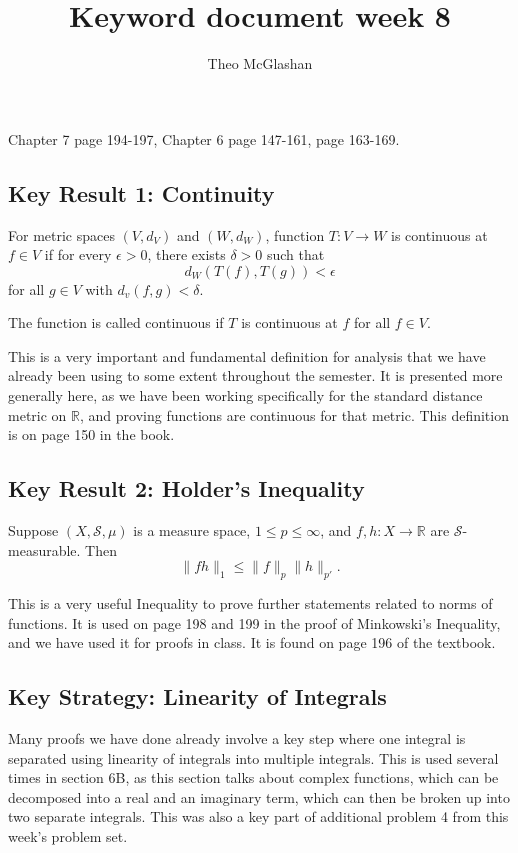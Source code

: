 \documentclass[12pt]{article}
\title{Keyword document week 8}
\author{Theo McGlashan}
\date{}
\newcommand{\R}{\mathbb{R}}
\newcommand{\eq}[1]{\begin{equation*}#1\end{equation*}}
\begin{document}
\maketitle

Chapter 7 page 194-197, Chapter 6 page 147-161, page 163-169.

\subsection*{Key Result 1: Continuity}

For metric spaces $(V, d_V)$ and $(W, d_W)$, function $T : V \to W$ is continuous at $f \in V$ if for every $\epsilon > 0$, there exists $\delta > 0$ such that
\eq{d_W(T(f), T(g)) < \epsilon}
for all $g \in V$ with $d_v(f, g) < \delta$.

The function is called continuous if $T$ is continuous at $f$ for all $f \in V$.

This is a very important and fundamental definition for analysis that we have already been using to some extent throughout the semester. It is presented more generally here, as we have been working specifically for the standard distance metric on $\R$, and proving functions are continuous for that metric. This definition is on page 150 in the book.

\subsection*{Key Result 2: Holder's Inequality}

Suppose $(X, \mathcal{S}, \mu)$ is a measure space, $1 \leq p \leq \infty$, and $f, h : X \to \R$ are $\mathcal{S}$-measurable. Then
\eq{\|fh\|_1 \leq \|f\|_p\|h\|_{p'}.}

This is a very useful Inequality to prove further statements related to norms of functions. It is used on page 198 and 199 in the proof of Minkowski's Inequality, and we have used it for proofs in class. It is found on page 196 of the textbook.

\subsection*{Key Strategy: Linearity of Integrals}

Many proofs we have done already involve a key step where one integral is separated using linearity of integrals into multiple integrals. This is used several times in section 6B, as this section talks about complex functions, which can be decomposed into a real and an imaginary term, which can then be broken up into two separate integrals. This was also a key part of additional problem 4 from this week's problem set.
\end{document}
